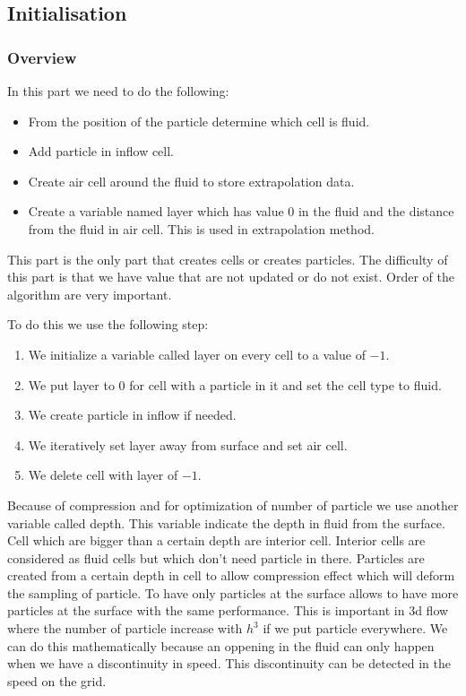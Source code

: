 \subsection{Initialisation}

\subsubsection{Overview}
In this part we need to do the following:
\begin{itemize}
 \item From the position of the particle determine which cell is fluid.
 \item Add particle in inflow cell.
 \item Create air cell around the fluid to store extrapolation data.
 \item Create a variable named layer which has value $0$ in the fluid and the distance from the fluid in air cell.
 This is used in extrapolation method.
\end{itemize}
This part is the only part that creates cells or creates particles.
The difficulty of this part is that we have value that are not updated or do not exist.
Order of the algorithm are very important.

To do this we use the following step:
\begin{enumerate}
 \item We initialize a variable called layer on every cell to a value of $-1$.
 \item We put layer to $0$ for cell with a particle in it and set the cell type to fluid.
 \item We create particle in inflow if needed.
 \item We iteratively set layer away from surface and set air cell.
 \item We delete cell with layer of $-1$.
\end{enumerate}

Because of compression and for optimization of number of particle we use another variable called depth.
This variable indicate the depth in fluid from the surface.
Cell which are bigger than a certain depth are interior cell.
Interior cells are considered as fluid cells but which don't need particle in there.
Particles are created from  a certain depth in cell to allow compression effect which will deform the sampling of particle.
To have only particles at the surface allows to have more particles at the surface with the same performance. This is important in 3d flow
where the number of particle increase with $h^3$ if we put particle everywhere.
We can do this mathematically because an oppening in the fluid can only happen when we have a discontinuity in speed.
This discontinuity can be detected in the speed on the grid.

